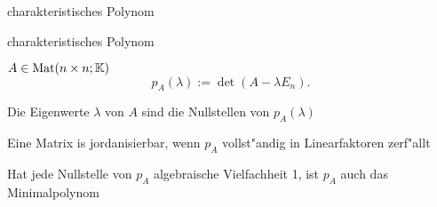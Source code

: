 \documentclass[class=article, crop=false]{standalone}
\begin{document}
\begin{zettel}{charakteristisches Polynom}
\begin{flashcard}[dzxcnfoo]{charakteristisches Polynom}
	\begin{definition}
		$A \in \operatorname{Mat}(n \times n; \mathbb{K}) $
		\[
			p_{A}(\lambda ) := \det(A - \lambda E_{n})
		.\]
	\end{definition}
\end{flashcard}

Die Eigenwerte $\lambda$ von $A$ sind die Nullstellen von $p_{A}(\lambda)$

Eine Matrix is jordanisierbar, wenn $p_{A}$ vollst"andig in Linearfaktoren zerf"allt

Hat jede Nullstelle von $p_{A}$ algebraische Vielfachheit 1, ist $p_{A}$ auch das Minimalpolynom
\end{zettel}
\end{document}
